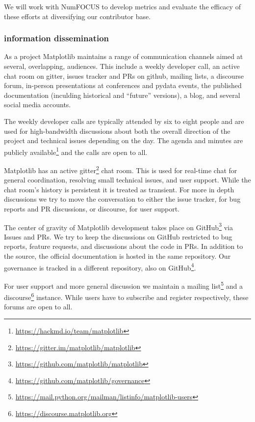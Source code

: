 \documentclass[12pt]{article}
\numberwithin{page}{section}
\begin{document}
We will work with NumFOCUS to develop metrics and evaluate the efficacy of
these efforts at diversifying our contributor base.

\subsubsection{information dissemination}

As a project Matplotlib maintains a range of communication channels
aimed at several, overlapping, audiences.  This include a weekly
developer call, an active chat room on gitter, issues tracker and PRs
on github, mailing lists, a discourse forum, in-person presentations
at conferences and pydata events, the published documentation
(inculding historical and ``future'' versions), a blog, and several
social media accounts.

The weekly developer calls are typically attended by six to eight
people and are used for high-bandwidth discussions about both the
overall direction of the project and technical issues depending on the
day.  The agenda and minutes are publicly
available\footnote{\url{https://hackmd.io/team/matplotlib}} and the
calls are open to all.

Matplotlib has an active
gitter\footnote{\url{https://gitter.im/matplotlib/matplotlib}} chat
room.  This is used for real-time chat for general coordination,
resolving small technical issues, and user support.  While the chat
room's history is persistent it is treated as transient.  For more in
depth discussions we try to move the conversation to either the issue
tracker, for bug reports and PR discussions, or discourse, for user
support.

The center of gravity of Matplotlib development takes place on
GitHub\footnote{\url{https://github.com/matplotlib/matplotlib}} via
Issues and PRs.  We try to keep the discussions on GitHub restricted
to bug reports, feature requests, and discussions about the code in
PRs.  In addition to the source, the official documentation is hosted
in the same repository.  Our governance is tracked in a different
repository, also on
GitHub\footnote{\url{https://github.com/matplotlib/governance}}.

For user support and more general discussion we maintain a mailing
list\footnote{\url{https://mail.python.org/mailman/listinfo/matplotlib-users}}
and a discourse\footnote{\url{https://discourse.matplotlib.org}}
instance.  While users have to subscribe and register respectively,
these forums are open to all.
\end{document}
